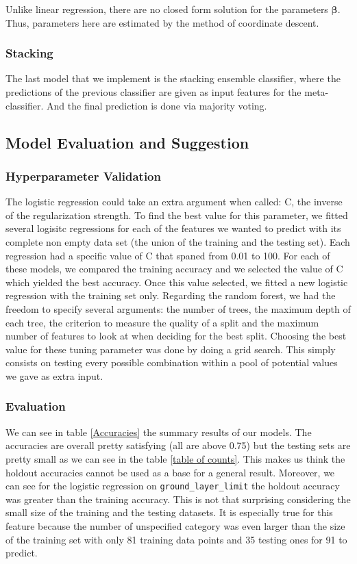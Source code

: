 \documentclass[11pt, oneside]{article}
\begin{document}
\noindent Unlike linear regression, there are no closed form solution for the parameters $\boldsymbol\beta$. Thus, parameters here are estimated by the method of coordinate descent.

\subsubsection{Stacking}
The last model that we implement is the stacking ensemble classifier, where the predictions of the previous classifier are given as input features for the meta-classifier. And the final prediction is done via majority voting.

\subsection{Model Evaluation and Suggestion}

\subsubsection{Hyperparameter Validation}
The logistic regression could take an extra argument when called: C, the inverse of the regularization strength. To find the best value for this parameter, we fitted several logisitc regressions for each of the features we wanted to predict with its complete non empty data set (the union of the training and the testing set). Each regression had a specific value of C that spaned from 0.01 to 100. For each of these models, we compared the training accuracy and we selected the value of C which yielded the best accuracy. Once this value selected, we fitted a new logistic regression with the training set only.
\bigbreak
\noindent Regarding the random forest, we had the freedom to specify several arguments: the number of trees, the maximum depth of each tree, the criterion to measure the quality of a split and the maximum number of features to look at when deciding for the best split. Choosing the best value for these tuning parameter was done by doing a grid search. This simply consists on testing every possible combination within a pool of potential values we gave as extra input. 

\subsubsection{Evaluation}
We can see in table \ref{Accuracies} the summary results of our models. The accuracies are overall pretty satisfying (all are above 0.75) but the testing sets are pretty small as we can see in the table \ref{table of counts}. This makes us think the holdout accuracies cannot be used as a base for a general result. Moreover, we can see for the logistic regression on \texttt{ground\_layer\_limit} the holdout accuracy was greater than the training accuracy. This is not that surprising considering the small size of the training and the testing datasets. It is especially true for this feature because the number of unspecified category was even larger than the size of the training set with only 81 training data points and 35 testing ones for 91 to predict.
 
\end{document}
